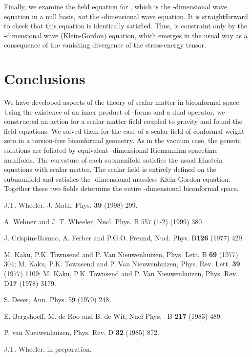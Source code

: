 \documentclass[a4paper,a4paper]{article}
\begin{document}
\smallskip

Finally, we examine the field equation for \coordHE{}, which is the \coordHE{}-dimensional wave equation in a null basis, \textit{not }the \coordHE{}%
-dimensional wave equation. It is straightforward to check that this
equation is identically satisfied. Thus, \myHighlight{$\phi $}\coordHE{} is constraint only by the \coordHE{}-dimensional wave (Klein-Gordon) equation, which emerges in the usual way
as a consequence of the vanishing divergence of the stress-energy tensor.

\section{Conclusions}

We have developed aspects of the theory of scalar matter in biconformal
space. Using the existence of an inner product of \coordHE{}-forms and a dual
operator, we constructed an action for a scalar matter field \coordHE{}
coupled to gravity and found the field equations. We solved them for the
case of a scalar field of conformal weight zero in a torsion-free
biconformal geometry. As in the vacuum case, the generic solutions are
foliated by equivalent \coordHE{}-dimensional Riemannian spacetime manifolds. The
curvature of each submanifold satisfies the usual Einstein equations with
scalar matter. The scalar field is entirely defined on the submanifold and
satisfies the \coordHE{}-dimensional massless Klein-Gordon equation. Together these
two fields determine the entire \coordHE{}-dimensional biconformal space.

\begin{thebibliography}{9}
  J.T. Wheeler, J. Math. Phys. \textbf{%
39} (1998) 299.

  A. Wehner and J. T. Wheeler, Nucl. Phys. B 557 (1-2) (1999) 380.

  J. Crispim-Romao, A. Ferber and P.G.O.
Freund, Nucl. Phys. B\textbf{126} (1977) 429.

  M. Kaku, P.K. Townsend and P. Van Nieuwenhuizen,
Phys. Lett. B \textbf{69 }(1977) 304; M. Kaku, P.K. Townsend and P. Van
Nieuwenhuizen, Phys. Rev. Lett. \textbf{39} (1977) 1109; M. Kaku, P.K.
Townsend and P. Van Nieuwenhuizen, Phys. Rev. D\textbf{17} (1978) 3179.

  S. Deser, Ann. Phys. 59 (1970) 248.

  E. Bergshoeff, M. de Roo and B. de Wit, Nucl Phys. \ B%
\textbf{217} (1983) 489.

  P. van Nieuwenhuizen, Phys. Rev. D \textbf{32}
(1985) 872.

  J.T. Wheeler, in preparation.
\end{thebibliography}
\end{document}
